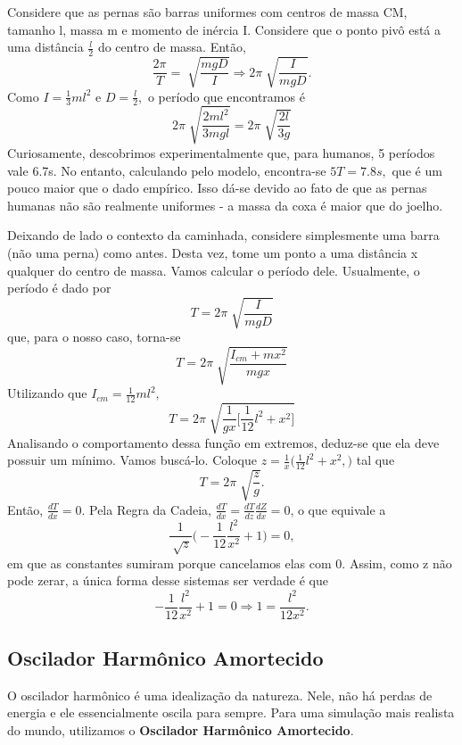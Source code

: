 \documentclass{article}
\begin{document}
  Considere que as pernas são barras uniformes com centros de massa CM, tamanho l, massa m e momento de inércia I. Considere
que o ponto pivô está a uma distância \(\frac{l}{2}\) do centro de massa. Então, 
  \[
    \frac{2\pi }{T} = \sqrt[]{\frac{mgD}{I}} \Rightarrow 2\pi \sqrt[]{\frac{I}{mgD}}.
  \]
Como \(I = \frac{1}{3}ml^{2}\) e \(D = \frac{l}{2},\) o período que encontramos é 
  \[
    2\pi \sqrt[]{\frac{2ml^{2}}{3mgl}} = 2\pi \sqrt[]{\frac{2l}{3g}}
  \]
  Curiosamente, descobrimos experimentalmente que, para humanos, 5 períodos vale 6.7s. No entanto,
calculando pelo modelo, encontra-se \(5T=7.8s,\) que é um pouco maior que o dado empírico. Isso dá-se 
devido ao fato de que as pernas humanas não são realmente uniformes - a massa da coxa é maior que do joelho.
  
  Deixando de lado o contexto da caminhada, considere simplesmente uma barra (não uma perna) como antes. Desta vez,
tome um ponto a uma distância x qualquer do centro de massa. Vamos calcular o período dele.
Usualmente, o período é dado por 
  \[
    T = 2\pi \sqrt[]{\frac{I}{mgD}} 
  \]
que, para o nosso caso, torna-se 
  \[
    T = 2\pi \sqrt[]{\frac{I_{cm}+mx^{2}}{mgx}}
  \]
Utilizando que \(I_{cm}= \frac{1}{12}ml^{2},\) 
  \[
    T = 2\pi \sqrt[]{\frac{1}{gx}\biggl[\frac{1}{12}l^{2}+x^{2}\biggr]} 
  \]
Analisando o comportamento dessa função em extremos, deduz-se que ela deve possuir um mínimo. Vamos buscá-lo.
Coloque \(z = \frac{1}{x}\biggl(\frac{1}{12}l^{2}+x^{2},\biggr)\) tal que 
  \[
    T = 2\pi \sqrt[]{\frac{z}{g}}.
  \]
  Então, \(\frac{dT}{dx}=0\). Pela Regra da Cadeia, \(\frac{dT}{dx} = \frac{dT}{dz}\frac{dZ}{dx} = 0\), o que equivale a 
  \[
    \frac{1}{\sqrt[]{z}}\biggl(-\frac{1}{12}\frac{l^{2}}{x^{2}}+1\biggr) = 0,
  \]
 em que as constantes sumiram porque cancelamos elas com 0. Assim, como z não pode zerar, a única forma desse sistemas ser verdade é que 
  \[
    -\frac{1}{12}\frac{l^{2}}{x^{2}}+1 = 0 \Rightarrow 1 = \frac{l^{2}}{12x^{2}}.
  \]
\subsection{Oscilador Harmônico Amortecido}
  O oscilador harmônico é uma idealização da natureza. Nele, não há perdas de energia e ele essencialmente
oscila para sempre. Para uma simulação mais realista do mundo, utilizamos o \textbf{Oscilador Harmônico Amortecido}.
\end{document}
